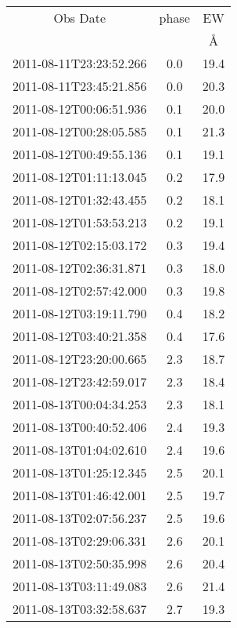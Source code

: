 \begin{table}
\begin{tabular}{ccc}
\hline \hline
Obs Date & phase & EW \\
 & $\mathrm{}$ & \AA \\
\hline
2011-08-11T23:23:52.266 & 0.0 & 19.4 \\
2011-08-11T23:45:21.856 & 0.0 & 20.3 \\
2011-08-12T00:06:51.936 & 0.1 & 20.0 \\
2011-08-12T00:28:05.585 & 0.1 & 21.3 \\
2011-08-12T00:49:55.136 & 0.1 & 19.1 \\
2011-08-12T01:11:13.045 & 0.2 & 17.9 \\
2011-08-12T01:32:43.455 & 0.2 & 18.1 \\
2011-08-12T01:53:53.213 & 0.2 & 19.1 \\
2011-08-12T02:15:03.172 & 0.3 & 19.4 \\
2011-08-12T02:36:31.871 & 0.3 & 18.0 \\
2011-08-12T02:57:42.000 & 0.3 & 19.8 \\
2011-08-12T03:19:11.790 & 0.4 & 18.2 \\
2011-08-12T03:40:21.358 & 0.4 & 17.6 \\
2011-08-12T23:20:00.665 & 2.3 & 18.7 \\
2011-08-12T23:42:59.017 & 2.3 & 18.4 \\
2011-08-13T00:04:34.253 & 2.3 & 18.1 \\
2011-08-13T00:40:52.406 & 2.4 & 19.3 \\
2011-08-13T01:04:02.610 & 2.4 & 19.6 \\
2011-08-13T01:25:12.345 & 2.5 & 20.1 \\
2011-08-13T01:46:42.001 & 2.5 & 19.7 \\
2011-08-13T02:07:56.237 & 2.5 & 19.6 \\
2011-08-13T02:29:06.331 & 2.6 & 20.1 \\
2011-08-13T02:50:35.998 & 2.6 & 20.4 \\
2011-08-13T03:11:49.083 & 2.6 & 21.4 \\
2011-08-13T03:32:58.637 & 2.7 & 19.3 \\
\hline
\end{tabular}
\end{table}
